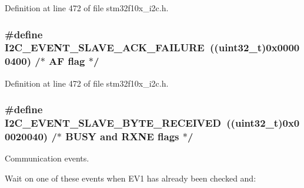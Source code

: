 Definition at line 472 of file stm32f10x\+\_\+i2c.\+h.

\subsubsection[{\texorpdfstring{I2\+C\+\_\+\+E\+V\+E\+N\+T\+\_\+\+S\+L\+A\+V\+E\+\_\+\+A\+C\+K\+\_\+\+F\+A\+I\+L\+U\+RE}{I2C_EVENT_SLAVE_ACK_FAILURE}}]{\setlength{\rightskip}{0pt plus 5cm}\#define I2\+C\+\_\+\+E\+V\+E\+N\+T\+\_\+\+S\+L\+A\+V\+E\+\_\+\+A\+C\+K\+\_\+\+F\+A\+I\+L\+U\+RE~(({\bf uint32\+\_\+t})0x00000400)  /$\ast$ A\+F flag $\ast$/}\hypertarget{group___i2_c___events_ga249bd611f1ca64653c0bfc606c591088}{}\label{group___i2_c___events_ga249bd611f1ca64653c0bfc606c591088}


Definition at line 472 of file stm32f10x\+\_\+i2c.\+h.

\subsubsection[{\texorpdfstring{I2\+C\+\_\+\+E\+V\+E\+N\+T\+\_\+\+S\+L\+A\+V\+E\+\_\+\+B\+Y\+T\+E\+\_\+\+R\+E\+C\+E\+I\+V\+ED}{I2C_EVENT_SLAVE_BYTE_RECEIVED}}]{\setlength{\rightskip}{0pt plus 5cm}\#define I2\+C\+\_\+\+E\+V\+E\+N\+T\+\_\+\+S\+L\+A\+V\+E\+\_\+\+B\+Y\+T\+E\+\_\+\+R\+E\+C\+E\+I\+V\+ED~(({\bf uint32\+\_\+t})0x00020040)  /$\ast$ B\+U\+S\+Y and R\+X\+N\+E flags $\ast$/}\hypertarget{group___i2_c___events_ga8b244626839940569c6c8bbfc4efe21d}{}\label{group___i2_c___events_ga8b244626839940569c6c8bbfc4efe21d}


Communication events. 

Wait on one of these events when E\+V1 has already been checked and\+:


